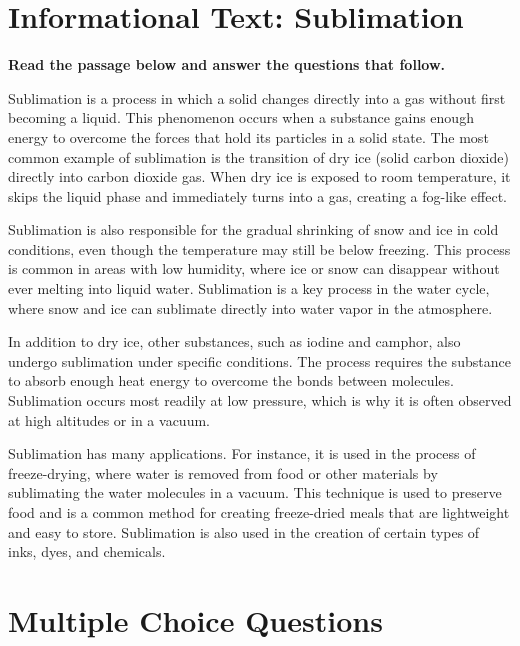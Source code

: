 \documentclass[12pt]{article}
\begin{document}
\onehalfspacing

\section*{Informational Text: Sublimation}

\textbf{Read the passage below and answer the questions that follow.}

Sublimation is a process in which a solid changes directly into a gas without first becoming a liquid. This phenomenon occurs when a substance gains enough energy to overcome the forces that hold its particles in a solid state. The most common example of sublimation is the transition of dry ice (solid carbon dioxide) directly into carbon dioxide gas. When dry ice is exposed to room temperature, it skips the liquid phase and immediately turns into a gas, creating a fog-like effect.

Sublimation is also responsible for the gradual shrinking of snow and ice in cold conditions, even though the temperature may still be below freezing. This process is common in areas with low humidity, where ice or snow can disappear without ever melting into liquid water. Sublimation is a key process in the water cycle, where snow and ice can sublimate directly into water vapor in the atmosphere.

In addition to dry ice, other substances, such as iodine and camphor, also undergo sublimation under specific conditions. The process requires the substance to absorb enough heat energy to overcome the bonds between molecules. Sublimation occurs most readily at low pressure, which is why it is often observed at high altitudes or in a vacuum.

Sublimation has many applications. For instance, it is used in the process of freeze-drying, where water is removed from food or other materials by sublimating the water molecules in a vacuum. This technique is used to preserve food and is a common method for creating freeze-dried meals that are lightweight and easy to store. Sublimation is also used in the creation of certain types of inks, dyes, and chemicals.

\newpage

\section*{Multiple Choice Questions}
\end{document}
